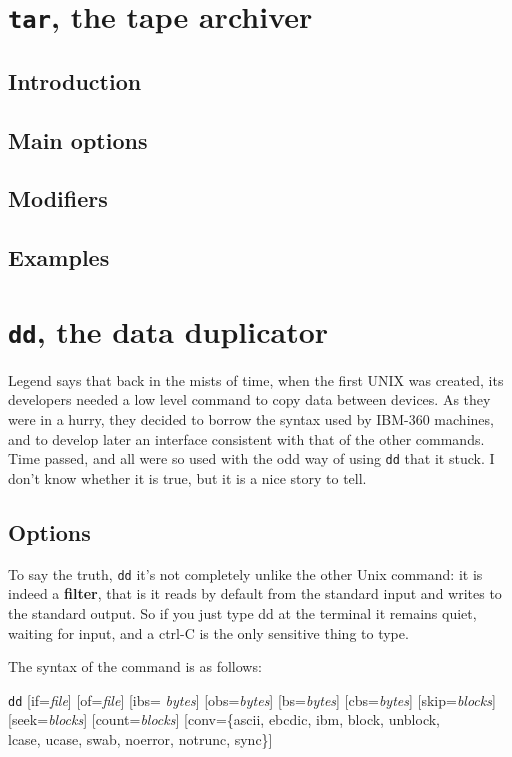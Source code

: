 \section{{\tt tar}, the tape archiver}

\subsection{Introduction}

\subsection{Main options}

\subsection{Modifiers}

\subsection{Examples}

\section{{\tt dd}, the data duplicator}

Legend says that back in the mists of time, when the first UNIX was
created, its developers needed a low level command to copy data between
devices. As they were in a hurry, they decided to borrow the syntax used
by IBM-360 machines, and to develop later an interface consistent with
that of the other commands. Time passed, and all were so used with the odd
way of using {\tt dd} that it stuck. I don't know whether it is true, but
it is a nice story to tell.

\subsection{Options}

To say the truth, {\tt dd} it's not completely unlike the other Unix
command: it is indeed a {\bf filter}, that is it reads by default from the
standard input and writes to the standard output. So if you just type dd
at the terminal it remains quiet, waiting for input, and a ctrl-C is the
only sensitive thing to type.

The syntax of the command is as follows:

\vspace{1ex}
\begin{command}
  {\tt dd} [if={\sl file}] [of={\sl file}] [ibs={\sl
    bytes}] [obs={\sl bytes}] [bs={\sl bytes}] [cbs={\sl bytes}]
  [skip={\sl blocks}]\\
  \hspace{.5in} [seek={\sl blocks}] [count={\sl blocks}]
  [conv=\{ascii, ebcdic, ibm, block, unblock,\\
  \hspace{.5in} lcase, ucase, swab, noerror, notrunc, sync\}]
\end{command}

